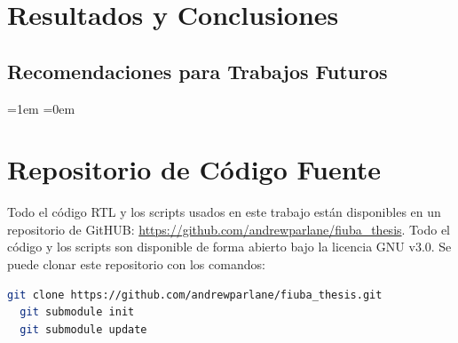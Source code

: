 \documentclass[a4paper, twoside, 11pt]{report}
\begin{document}

\FloatBarrier
\chapter{Resultados y Conclusiones}

\FloatBarrier
\section{Recomendaciones para Trabajos Futuros}


\FloatBarrier
\newpage

\emergencystretch=1em
\printbibliography
\emergencystretch=0em


\appendix

\titleformat{\chapter}[display] 
{\normalfont\Huge\bfseries}{\chaptertitlename\ \thechapter:}{0.2em}{\huge} 

\newpage
\chapter{Repositorio de Código Fuente}

Todo el código RTL y los scripts usados en este trabajo están disponibles en un repositorio de GitHUB: \url{https://github.com/andrewparlane/fiuba_thesis}. Todo el código y los scripts son disponible de forma abierto bajo la licencia GNU v3.0. Se puede clonar este repositorio con los comandos:

\begin{lstlisting}[language=bash,basicstyle=\small]
  git clone https://github.com/andrewparlane/fiuba_thesis.git
  git submodule init
  git submodule update
\end{lstlisting}
\end{document}
